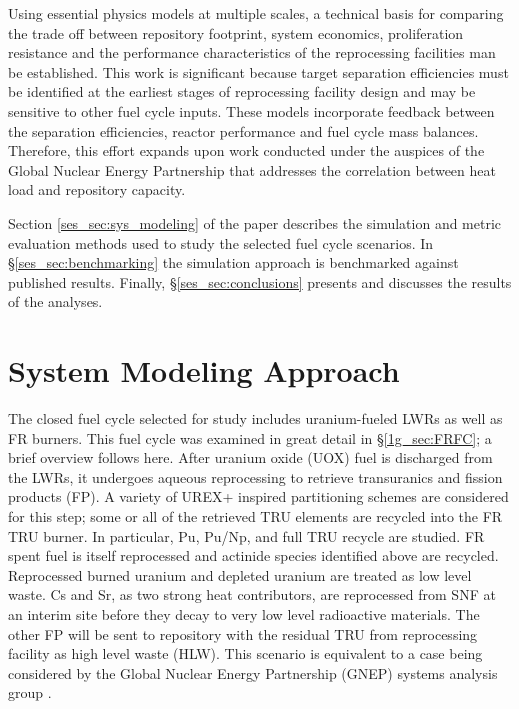 Using essential physics models at multiple scales,
a technical basis for comparing the trade off between
repository footprint, system economics, proliferation resistance and
the performance characteristics of the reprocessing facilities man be established.  This
work is significant because target separation efficiencies must be
identified at the earliest stages of reprocessing facility design
and may be sensitive to other fuel cycle inputs.  These
models incorporate feedback between the separation efficiencies, reactor
performance and fuel cycle mass balances.  Therefore, this effort
expands upon work conducted under the auspices of the Global Nuclear
Energy Partnership \cite{repmodel} that addresses the correlation between heat load
and repository capacity.  

Section \ref{ses_sec:sys_modeling} of the paper describes the simulation and metric evaluation
methods used to study the selected fuel cycle scenarios.  In \S \ref{ses_sec:benchmarking}
the simulation approach is benchmarked against published results. 
Finally, \S \ref{ses_sec:conclusions} presents and discusses the results of the analyses.


\section{System Modeling Approach}
\label{ses_sec:sys_modeling}
The closed fuel cycle selected for study includes uranium-fueled LWRs
as well as FR burners.  This fuel cycle was examined in great detail in 
\S \ref{1g_sec:FRFC}; a brief overview follows here.  After uranium oxide 
(UOX) fuel is discharged from the LWRs, it undergoes aqueous reprocessing 
to retrieve transuranics and fission products (FP).  A variety of UREX+ inspired
partitioning schemes are considered for this step; some or all of the
retrieved TRU elements are recycled into the FR TRU burner.  In
particular, Pu, Pu/Np, and full TRU recycle are studied.  FR spent fuel
is itself reprocessed and actinide species identified above are
recycled. Reprocessed burned uranium and depleted uranium are treated as
low level waste. Cs and Sr, as two strong heat contributors, are
reprocessed from SNF at an interim site before they decay to very low
level radioactive materials. The other FP will be sent to repository
with the residual TRU from reprocessing facility as high level waste
(HLW).  This scenario is equivalent to a case being considered by the
Global Nuclear Energy Partnership (GNEP) systems analysis group \cite{Piet2004}. 


